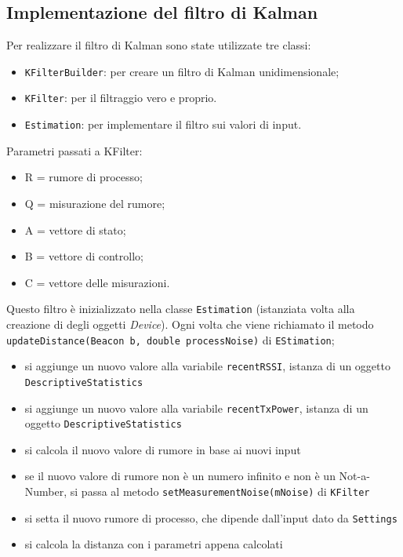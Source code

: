 \subsection{Implementazione del filtro di Kalman}

Per realizzare il filtro di Kalman sono state utilizzate tre classi: 
\begin{itemize}
	\item \texttt{KFilterBuilder}: per creare un filtro di Kalman unidimensionale;
	\item \texttt{KFilter}: per il filtraggio vero e proprio.
	\item \texttt{Estimation}: per implementare il filtro sui valori di input.
\end{itemize}
Parametri passati a KFilter:
\begin{itemize}
	\item R = rumore di processo;
	\item Q = misurazione del rumore;
	\item A = vettore di stato;
	\item B = vettore di controllo;
	\item C = vettore delle misurazioni.
\end{itemize}

Questo filtro è inizializzato nella classe \texttt{Estimation} (istanziata volta alla creazione di degli oggetti \textit{Device}). Ogni volta che viene richiamato il metodo \texttt{updateDistance(Beacon b, double processNoise)} di \texttt{EStimation};
\begin{itemize}
	\item si aggiunge un nuovo valore alla variabile \texttt{recentRSSI}, istanza di un oggetto \texttt{DescriptiveStatistics}
	\item si aggiunge un nuovo valore alla variabile \texttt{recentTxPower}, istanza di un oggetto \texttt{DescriptiveStatistics}
	\item si calcola il nuovo valore di rumore in base ai nuovi input
	\item se il nuovo valore di rumore non è un numero infinito e non è un Not-a-Number, si passa al metodo \texttt{setMeasurementNoise(mNoise)} di \texttt{KFilter}
	\item si setta il nuovo rumore di processo, che dipende dall'input dato da \texttt{Settings}
	\item si calcola la distanza con i parametri appena calcolati
\end{itemize}

